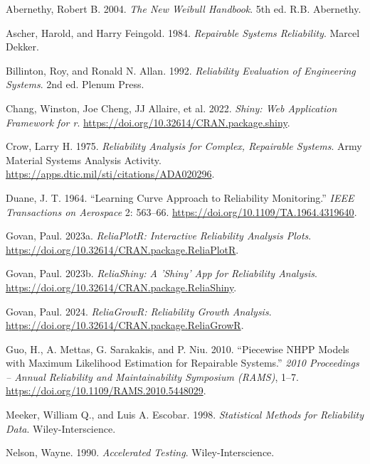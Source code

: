 \documentclass[
  letterpaper,
  DIV=11,
  numbers=noendperiod]{scrreprt}
\newlength{\cslhangindent}
\newenvironment{CSLReferences}[2] %
 {\begin{list}{}{%
  \setlength{\itemindent}{0pt}
  \setlength{\leftmargin}{0pt}
  \setlength{\parsep}{0pt}
  \ifodd #1
   \setlength{\leftmargin}{\cslhangindent}
   \setlength{\itemindent}{-1\cslhangindent}
  \fi
  \setlength{\itemsep}{#2\baselineskip}}}
 {\end{list}}
\begin{document}
\protect{}\label{refs}
\begin{CSLReferences}{1}{1}
Abernethy, Robert B. 2004. \emph{The New Weibull Handbook}. 5th ed. R.B.
Abernethy.

Ascher, Harold, and Harry Feingold. 1984. \emph{Repairable Systems
Reliability}. Marcel Dekker.

Billinton, Roy, and Ronald N. Allan. 1992. \emph{Reliability Evaluation
of Engineering Systems}. 2nd ed. Plenum Press.

Chang, Winston, Joe Cheng, JJ Allaire, et al. 2022. \emph{Shiny: Web
Application Framework for r}.
\url{https://doi.org/10.32614/CRAN.package.shiny}.

Crow, Larry H. 1975. \emph{Reliability Analysis for Complex, Repairable
Systems}. Army Material Systems Analysis Activity.
\url{https://apps.dtic.mil/sti/citations/ADA020296}.

Duane, J. T. 1964. {``Learning Curve Approach to Reliability
Monitoring.''} \emph{IEEE Transactions on Aerospace} 2: 563--66.
\url{https://doi.org/10.1109/TA.1964.4319640}.

Govan, Paul. 2023a. \emph{ReliaPlotR: Interactive Reliability Analysis
Plots}. \url{https://doi.org/10.32614/CRAN.package.ReliaPlotR}.

Govan, Paul. 2023b. \emph{ReliaShiny: A 'Shiny' App for Reliability
Analysis}. \url{https://doi.org/10.32614/CRAN.package.ReliaShiny}.

Govan, Paul. 2024. \emph{ReliaGrowR: Reliability Growth Analysis}.
\url{https://doi.org/10.32614/CRAN.package.ReliaGrowR}.

Guo, H., A. Mettas, G. Sarakakis, and P. Niu. 2010. {``Piecewise {NHPP}
Models with Maximum Likelihood Estimation for Repairable Systems.''}
\emph{2010 Proceedings -- Annual Reliability and Maintainability
Symposium (RAMS)}, 1--7.
\url{https://doi.org/10.1109/RAMS.2010.5448029}.

Meeker, William Q., and Luis A. Escobar. 1998. \emph{Statistical Methods
for Reliability Data}. Wiley-Interscience.

Nelson, Wayne. 1990. \emph{Accelerated Testing}. Wiley-Interscience.


\end{CSLReferences}
\end{document}
